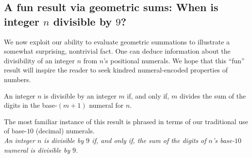 \subsection{A fun result via geometric sums: When is integer  $n$
  divisible by $9$?}
\label{sec:divisible-by-9}

We now exploit our ability to evaluate geometric summations to
illustrate a somewhat surprising, nontrivial fact.  One can deduce
information about the divisibility of an integer $n$ from $n$'s
positional numerals.  We hope that this ``fun'' result will inspire
the reader to seek kindred numeral-encoded properties of numbers.

\begin{prop}
\label{thm:div-by-b-bar}
An integer $n$ is divisible by an integer $m$ if, and only if, $m$
divides the sum of the digits in the base-$(m+1)$ numeral for $n$.
\end{prop}

The most familiar instance of this result is phrased in terms of our
traditional use of base-$10$ (decimal) numerals. \\
{\it An integer $n$ is divisible by $9$ if, and only if, the sum of
  the digits of $n$'s base-$10$ numeral is divisible by $9$.}

\smallskip

